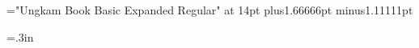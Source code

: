 \font\ExpandedRm="Ungkam Book Basic Expanded Regular" at 14pt
\settypefieldbymargins{1in}{1in}{1in}{1in}
\spaceskip 3.33333pt plus1.66666pt minus1.11111pt
 
\parindent5mm

\def\tlatnumspacing{\dimen@\spaceskip\spaceskip\dimen@\relax}

\newtoks\titletoks

\def\title#1{\global\titletoks{#1}}

\baselineskip12pt  

\newcount\figurecount {}

\intercolgutter=.3in


\noblackboxes

 

\centrehdrinfo{\ifnumberthispage\ten\rm \firstmark\fi}
\lefthdrinfo{\ifodd\pageno\else\ten\rm\folio\fi}
\righthdrinfo{\ifodd\pageno\ten\rm\folio\fi}


\def\X#1{\csname #1\endcsname}

\def\chapterspacing{\penalty-2000\vskip36pt plus7pt minus6pt}
\def\headingspacing{\penalty-1000\vskip20pt plus6pt minus4pt}

\newdimen\calcedpagetotal \newdimen\calctmp \newif\ifdidMaybeEject
\def\calcpagetotal{\calcedpagetotal\pagetotal
  \ifdim\footnoteSize>0pt
    \advance\calcedpagetotal\footnoteSize
    \advance\calcedpagetotal10pt
    \wlog{adding \footnoteSize=\the\footnoteSize+10pt (\ht\footins=\the\ht\footins)}%
  \fi
  \peek 
  \ifdim\ht\popped<\vsize
     \advance\calcedpagetotal\ht\popped
     \dimen\calctmp=\vsize
     \ifdim\calcedpagetotal>\dimen\calctmp
       \wlog{\calcedpagetotal =\the\calcedpagetotal > \the\dimen\calctmp (\the\vsize+\the\pageshrink)}%
       \wlog{removing \ht\popped=\the\ht\popped from calcedpagetotal}%
       \advance\calcedpagetotal-\ht\popped\fi
  \fi
  \voidpop}

\def\doMaybeEject{%
  \global\didMaybeEjecttrue
  \wlog{doMaybeEject: forcing eject}%
  \vfil\eject
}

